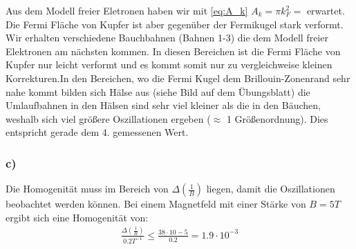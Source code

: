 Aus dem Modell freier Eletronen haben wir mit \eqref{eq:A_k} $A_k = \pi k_F^2 = $ erwartet. Die Fermi Fläche von Kupfer ist aber gegenüber der Fermikugel stark verformt. 
Wir erhalten verschiedene Bauchbahnen (Bahnen 1-3) die dem Modell freier Elektronen am nächsten kommen. In diesen Bereichen ist die Fermi Fläche von Kupfer nur leicht 
verformt und es kommt somit nur zu vergleichweise kleinen Korrekturen.In den Bereichen, wo die Fermi Kugel dem Brillouin-Zonenrand sehr nahe kommt bilden sich
Hälse aus (siehe Bild auf dem Übungsblatt) die Umlaufbahnen in den Hälsen sind sehr viel kleiner als die in den Bäuchen, weshalb sich viel größere Oszillationen ergeben
($\approx$ 1 Größenordnung). Dies entspricht gerade dem 4. gemessenen Wert.

\subsubsection*{c)}

Die Homogenität muss im Bereich von $\Delta\left(\frac 1B\right)$ liegen, damit die Oszillationen beobachtet werden können. Bei einem Magnetfeld mit einer Stärke 
von $B=5T$ ergibt sich eine Homogenität von:
\begin{align*}
 \frac{\Delta \left(\frac 1B\right)}{0.2T^{-1}} \le \frac{38\cdot 10-5}{0.2} = 1.9\cdot 10^{-3}
\end{align*}